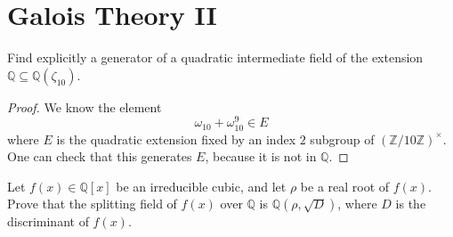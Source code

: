 \documentclass[openany]{book}
\newcommand{\Z}{\mathbb{Z}}
\newcommand{\Q}{\mathbb{Q}}
\newcommand{\om}{\omega}
\begin{document}
\section{Galois Theory II}

\begin{prob}
    Find explicitly a generator of a quadratic intermediate field of the extension $\mathbb{Q} \subseteq \mathbb{Q}(\zeta_{10})$.
    \end{prob}
\begin{proof}
    We know the element 
    \begin{equation*}
        \om_{10}+\om_{10}^{9}\in E
    \end{equation*}
    where $E$ is the quadratic extension fixed by an index $2$ subgroup of $(\Z/10\Z)^\times$. One can check that this generates $E$, because it is not in $\Q$.
\end{proof}




    








\begin{prop}
Let \( f(x) \in \mathbb{Q}[x] \) be an irreducible cubic, and let \( \rho \) be a real root of \( f(x) \). Prove that the splitting field of \( f(x) \) over \( \mathbb{Q} \) is \( \mathbb{Q}(\rho, \sqrt{D}) \), where \( D \) is the discriminant of \( f(x) \).
\end{prop}
\end{document}
